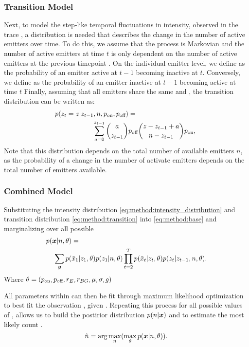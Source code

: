 \subsubsection{Transition Model}
Next, to model the step-like temporal fluctuations in intensity, observed in the trace \trace, 
a distribution is needed that describes the change in the number of active emitters \states over time. 
%
To do this, we assume that the process is Markovian and the number of active emitters  
at time $t$ is only dependent on the number of active emitters at the previous timepoint .
%
On the individual emitter level, we define \poff as the probability of an emitter active at $t-1$ becoming 
inactive at $t$. Conversely, we define \pon as the probability of an emitter inactive at $t-1$ becoming active at time $t$
%
Finally, assuming that all emitters share the same \poff and \pon, the transition distribution can be written as:
% 
\begin{align}
  \label{eq:method:transition}
  p(z_{t} = z | z_{t-1}, n, \pon, \poff) &=\\
	\sum_{a = 0}^{z_{t-1}}
    {a \choose z_{t-1}}
    &\poff
    {z - z_{t-1} + a \choose \n - z_{t-1}}
    \pon
    \text{,} \notag\
\end{align}
%
Note that this distribution depends on the total number of available emitters
$n$, as the probability of a change in the number of activate emitters
depends on the total number of emitters available.


\subsubsection{Combined Model}



Substituting the intensity distribution \eqref{eq:method:intensity_distribution} 
and transition distribution \eqref{eq:method:transition} 
into \eqref{eq:method:base} and marginalizing over all possible \states
% 
\begin{align}
  \label{eq:method:likelihood}
  p(\bm{x}|n,\theta) &=\\
    \sum_{\bm{y}}
      p(&\tilde{x}_{1}|z_{1}, \theta)
      p(z_{1}|n, \theta)
      \prod_{t=2}^{T}
        p(\tilde{x}_{t}|z_{t}, \theta)
        p(z_{t}|z_{t-1},n, \theta)
    \notag
  \text{.}
\end{align}
%
Where $\theta = (p_\text{on}, p_\text{off}, r_{E}, r_{BG}, \mu, \sigma, g)$

All parameters within \parameters can then be fit through 
maximum likelihood optimization to best fit the observation \trace, given \n. 
%
Repeating this process for all possible values of \n, allows us to build 
the postirior distribution $p(n | \bm{x})$ and to estimate 
the most likely count \estimatedn.
%
\begin{equation}
    \hat{n} =
    \text{arg}\max_{n}(
    \max_\theta
    p(\bm{x}|n,\theta))
  \text{.}
  \label{eq:method:optimization}
\end{equation}

